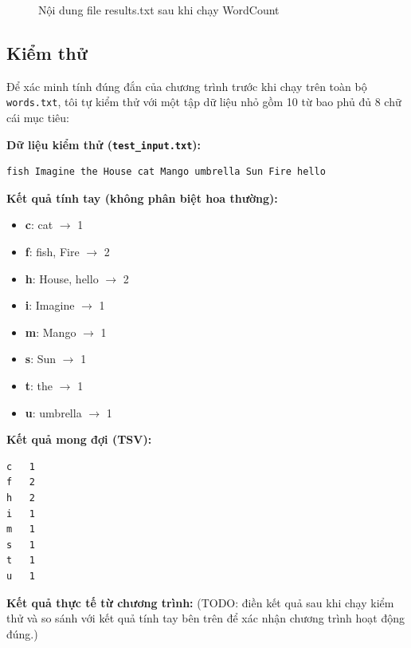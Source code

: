 \documentclass[12pt,a4paper]{article}
\begin{document}
\begin{figure}[H]
  \centering
  \caption{Nội dung file results.txt sau khi chạy WordCount}
  \label{fig:results}
\end{figure}

\subsection{Kiểm thử}

Để xác minh tính đúng đắn của chương trình trước khi chạy trên toàn bộ
\texttt{words.txt}, tôi tự kiểm thử với một tập dữ liệu nhỏ gồm 10 từ bao phủ
đủ 8 chữ cái mục tiêu:

\textbf{Dữ liệu kiểm thử (\texttt{test\_input.txt}):}
\begin{verbatim}
fish Imagine the House cat Mango umbrella Sun Fire hello
\end{verbatim}

\textbf{Kết quả tính tay (không phân biệt hoa thường):}
\begin{itemize}
  \item \textbf{c}: cat $\rightarrow$ 1
  \item \textbf{f}: fish, Fire $\rightarrow$ 2
  \item \textbf{h}: House, hello $\rightarrow$ 2
  \item \textbf{i}: Imagine $\rightarrow$ 1
  \item \textbf{m}: Mango $\rightarrow$ 1
  \item \textbf{s}: Sun $\rightarrow$ 1
  \item \textbf{t}: the $\rightarrow$ 1
  \item \textbf{u}: umbrella $\rightarrow$ 1
\end{itemize}

\textbf{Kết quả mong đợi (TSV):}
\begin{verbatim}
c	1
f	2
h	2
i	1
m	1
s	1
t	1
u	1
\end{verbatim}

\textbf{Kết quả thực tế từ chương trình:} (TODO: điền kết quả sau khi chạy kiểm
thử và so sánh với kết quả tính tay bên trên để xác nhận chương trình hoạt động
đúng.)

\end{document}
